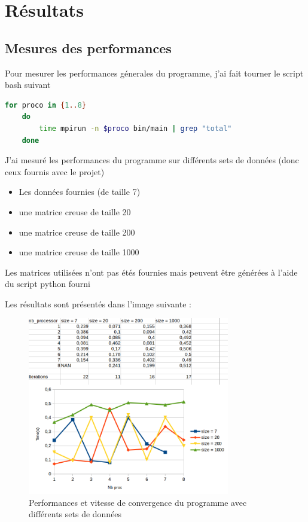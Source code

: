 \documentclass[11pt, a4paper]{article}
\begin{document}
\newpage

\section{Résultats}

\subsection{Mesures des performances}

Pour mesurer les performances génerales du programme, j'ai fait tourner le script bash suivant

\begin{lstlisting}[language=bash]
    for proco in {1..8}                                      
    do                
        time mpirun -n $proco bin/main | grep "total"
    done
\end{lstlisting}

J'ai mesuré les performances du programme sur différents sets de données (donc ceux fournis avec le projet)
\begin{itemize}
    \item Les données fournies (de taille 7)
    \item une matrice creuse de taille 20
    \item une matrice creuse de taille 200
    \item une matrice creuse de taille 1000\\
\end{itemize}

Les matrices utilisées n'ont pas étés fournies mais peuvent \^etre générées à l'aide du script python fourni

Les résultats sont présentés dans l'image suivante :

\begin{figure}[h]
    \centering
    \includegraphics[width=250pt]{perf.png}
    \caption{Performances et vitesse de convergence du programme avec différents sets de données}
\end{figure}
\end{document}
